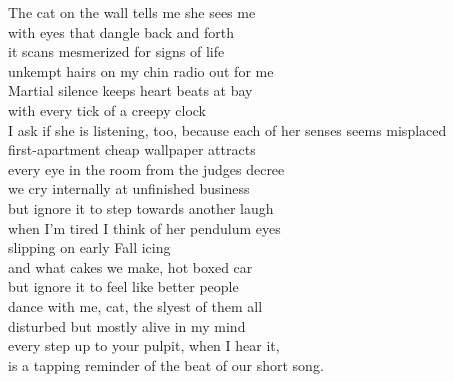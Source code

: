 The cat on the wall tells me she sees me\\
with eyes that dangle back and forth\\
it scans mesmerized for signs of life\\
unkempt hairs on my chin radio out for me\\

Martial silence keeps heart beats at bay\\
with every tick of a creepy clock\\
I ask if she is listening, too,
because each of her senses seems misplaced\\

first-apartment cheap wallpaper attracts\\
every eye in the room from the judges decree\\
we cry internally at unfinished business\\
but ignore it to step towards another laugh\\

when I'm tired I think of her pendulum eyes\\
slipping on early Fall icing\\
and what cakes we make, hot boxed car\\
but ignore it to feel like better people\\

dance with me, cat, the slyest of them all\\
disturbed but mostly alive in my mind\\
every step up to your pulpit, when I hear it,\\
is a tapping reminder of the beat of our short song.\\

